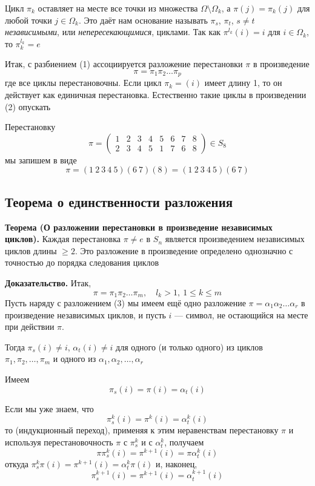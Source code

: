 \documentclass[a4paper,12pt]{article}
\theoremstyle{definition}
\theoremstyle{plain}
\theoremstyle{remark}
\begin{document}
	Цикл $\pi_k$ оставляет на месте все точки из множества $\Omega \setminus \Omega_k$, а $\pi(j) = \pi_k(j)$ для любой точки $j \in \Omega_k$. Это даёт нам основание называть $\pi_s$, $\pi_t$, $s \neq t$ \textit{независимыми}, или \textit{непересекающимися}, циклами. Так как $\pi^{l_k}(i) = i$ для $i \in \Omega_k$, то $\pi_k^{l_k} = e$
	
	Итак, с разбиением (1) ассоциируется разложение перестановки $\pi$ в произведение
	\[
	\pi = \pi_1 \pi_2 \dots \pi_p \tag{2}
	\]
	где все циклы перестановочны. Если цикл $\pi_k = (i)$ имеет длину 1, то он действует как единичная перестановка. Естественно такие циклы в произведении (2) опускать
	
	\begin{tcolorbox}[colback=gray!5, colframe=gray!50, title=Пример]
		Перестановку
		\[
		\pi = \begin{pmatrix}
			1 & 2 & 3 & 4 & 5 & 6 & 7 & 8 \\
			2 & 3 & 4 & 5 & 1 & 7 & 6 & 8
		\end{pmatrix} \in S_8
		\]
		мы запишем в виде
		\[
		\pi = (1\ 2\ 3\ 4\ 5)(6\ 7)(8) = (1\ 2\ 3\ 4\ 5)(6\ 7)
		\]
	\end{tcolorbox}
	
	\subsection{Теорема о единственности разложения}
	
	\noindent \textbf{Теорема (О разложении перестановки в произведение независимых циклов).}
	Каждая перестановка $\pi \neq e$ в $S_n$ является произведением независимых циклов длины $\geq 2$. Это разложение в произведение определено однозначно с точностью до порядка следования циклов
	
	\medskip
	\noindent \textbf{Доказательство.}
	Итак,
	\[
	\pi = \pi_1 \pi_2 \dots \pi_m, \quad l_k > 1, \ 1 \leq k \leq m \tag{3}
	\]
	Пусть наряду с разложением (3) мы имеем ещё одно разложение $\pi = \alpha_1 \alpha_2 \dots \alpha_r$ в произведение независимых циклов, и пусть $i$ — символ, не остающийся на месте при действии $\pi$.
	
	Тогда $\pi_s(i) \neq i$, $\alpha_t(i) \neq i$ для одного (и только одного) из циклов $\pi_1, \pi_2, \dots, \pi_m$ и одного из $\alpha_1, \alpha_2, \dots, \alpha_r$
	
	Имеем
	\[
	\pi_s(i) = \pi(i) = \alpha_t(i)
	\]
	
	Если мы уже знаем, что
	\[
	\pi_s^k(i) = \pi^k(i) = \alpha_t^k(i) \tag{4}
	\]
	то (индукционный переход), применяя к этим неравенствам перестановку $\pi$ и используя перестановочность $\pi$ с $\pi_s^k$ и с $\alpha_t^k$, получаем
	\[
	\pi \pi_s^k(i) = \pi^{k+1}(i) = \pi \alpha_t^k(i)
	\]
	откуда $\pi_s^k \pi(i) = \pi^{k+1}(i) = \alpha_t^k \pi(i)$ и, наконец,
	\[
	\pi_s^{k+1}(i) = \pi^{k+1}(i) = \alpha_t^{k+1}(i)
	\]
	
\end{document}
